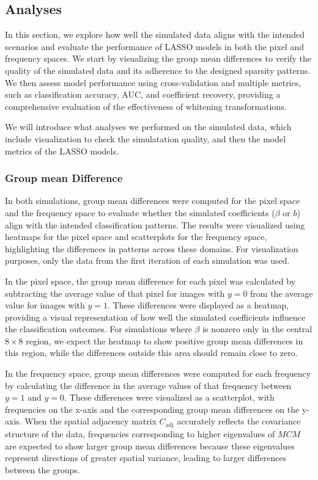 \documentclass[12pt]{article}
\begin{document}
\subsection{Analyses}

In this section, we explore how well the simulated data aligns with the intended scenarios and evaluate the performance of LASSO models in both the pixel and frequency spaces. We start by visualizing the group mean differences to verify the quality of the simulated data and its adherence to the designed sparsity patterns. We then assess model performance using cross-validation and multiple metrics, such as classification accuracy, AUC, and coefficient recovery, providing a comprehensive evaluation of the effectiveness of whitening transformations.


We will introduce what analyses we performed on the simulated data, which include visualization to check the simulatation quality, and then the model metrics of the LASSO models.

\subsubsection{Group mean Difference}

In both simulations, group mean differences were computed for the pixel space and the frequency space to evaluate whether the simulated coefficients (\( \beta \) or \( b \)) align with the intended classification patterns. The results were visualized using heatmaps for the pixel space and scatterplots for the frequency space, highlighting the differences in patterns across these domains. For visualization purposes, only the data from the first iteration of each simulation was used.

In the pixel space, the group mean difference for each pixel was calculated by subtracting the average value of that pixel for images with \( y = 0 \) from the average value for images with \( y = 1 \). These differences were displayed as a heatmap, providing a visual representation of how well the simulated coefficients influence the classification outcomes. For simulations where \( \beta \) is nonzero only in the central \( 8 \times 8 \) region, we expect the heatmap to show positive group mean differences in this region, while the differences outside this area should remain close to zero.

In the frequency space, group mean differences were computed for each frequency by calculating the difference in the average values of that frequency between \( y = 1 \) and \( y = 0 \). These differences were visualized as a scatterplot, with frequencies on the x-axis and the corresponding group mean differences on the y-axis. When the spatial adjacency matrix \( C_{\text{adj}} \) accurately reflects the covariance structure of the data, frequencies corresponding to higher eigenvalues of \( MCM \) are expected to show larger group mean differences because these eigenvalues represent directions of greater spatial variance, leading to larger differences between the groups.
\end{document}
